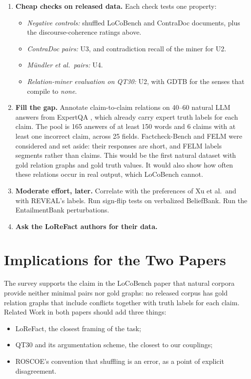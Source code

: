 \documentclass[10pt]{article}
\begin{document}
\begin{enumerate}
\item \textbf{Cheap checks on released data.} Each check tests one property:
  \begin{itemize}
  \item \emph{Negative controls:} shuffled LoCoBench and ContraDoc documents, plus the
    discourse-coherence ratings above.
  \item \emph{ContraDoc pairs:} U3, and contradiction recall of the miner for U2.
  \item \emph{Mündler et al.\ pairs:} U4.
  \item \emph{Relation-miner evaluation on QT30:} U2, with GDTB for the senses that compile to
    \emph{none}.
  \end{itemize}
\item \textbf{Fill the gap.} Annotate claim-to-claim relations on 40--60 natural LLM answers
  from ExpertQA \citep{expertqa}, which already carry expert truth labels for each claim. The pool
  is 165 answers of at least 150 words and 6 claims with at least one incorrect claim, across 25
  fields. Factcheck-Bench \citep{factcheckbench} and FELM \citep{felm} were considered and set
  aside: their responses are short, and FELM labels segments rather than claims. This would be the
  first natural dataset with gold relation graphs and gold truth values. It would also show how
  often these relations occur in real output, which LoCoBench cannot.
\item \textbf{Moderate effort, later.} Correlate with the preferences of Xu et al.\ and with
  REVEAL's labels. Run sign-flip tests on verbalized BeliefBank. Run the EntailmentBank
  perturbations.
\item \textbf{Ask the LoReFact authors for their data.}
\end{enumerate}

\section{Implications for the Two Papers}

The survey supports the claim in the LoCoBench paper that natural corpora provide neither minimal
pairs nor gold graphs: no released corpus has gold relation graphs that include conflicts together
with truth labels for each claim. Related Work in both papers should add three things:
\begin{itemize}
\item LoReFact, the closest framing of the task;
\item QT30 and its argumentation scheme, the closest to our couplings;
\item ROSCOE's convention that shuffling is an error, as a point of explicit disagreement.
\end{itemize}
\end{document}
